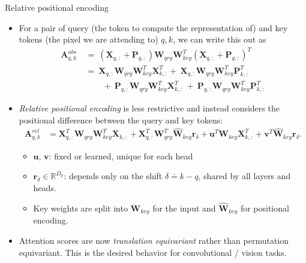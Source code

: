 \documentclass[9pt]{beamer}
\newcommand{\bb}{\mathbb}
\newcommand{\mb}{\bm}
\begin{document}
\newcommand{\WW}{ \mb W_{qry}\mb W_{key}^T }
\begin{frame}{Relative positional encoding}
\begin{itemize} \setlength\itemsep{1.2em}
\item For a pair of query (the token to compute the representation of) and key tokens (the pixel we are attending to) $q, k$, we can write this out as
\begin{align}
    \mb A^{abs}_{q, k} 
        \ &=\ (\mb X_{q,:} + \mb P_{q,:})\WW(\mb X_{q,:} + \mb P_{q,:})^T 
        \nonumber
        \\ &=\ \mb X_{q,:}\WW\mb X^T_{k,:} +\ \mb X_{q,:}\WW\mb P^T_{k,:} 
        \\ &\qquad +\ \mb P_{q,:}\WW\mb X^T_{k,:} \ +\ \mb P_{q,:}\WW\mb P^T_{k,:} \nonumber 
\end{align}

\item \emph{Relative positional encoding} is less restrictive and instead considers the positional difference between the query and key tokens:
\begin{align}
    \mb A^{rel}_{q, k} &= 
        \mb X_{q,:}^T \WW \mb X_{k,:}
        + \mb X_{q,:}^T \mb W_{qry}^T\hat{\mb W}_{key} \mb r_{\delta}
        + \mb u^T \mb W_{key} \mb X^T_{k,:}
        + \mb v^T \hat{\mb W}_{key} \mb r_{\delta}.
    \label{relposenc}
\end{align}
\vspace{-.15in}
\begin{itemize}
    \item $\bm u$, $\bm v$: fixed or learned, unique for each head 
    \item $\bm r_{\delta} \in \bb R^{D_p}$: depends only on the shift $\delta \doteq k -q$, shared by all layers and heads.
    \item Key weights are split into $\bm W_{key}$ for the input and $\hat{\bm W}_{key}$ for positional encoding.
\end{itemize}

\item Attention scores are now {\em translation equivariant} rather than permutation equivariant. This is the desired behavior for convolutional / vision tasks.
\end{itemize}
\end{frame}
\end{document}
